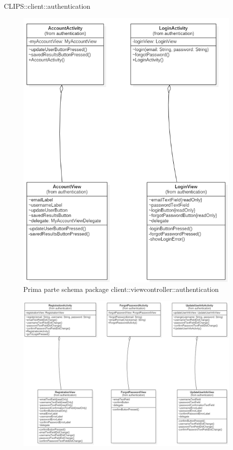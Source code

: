 \begin{componente}{CLIPS::client::authentication}
\begin{figure}[h!]
\centering
\includegraphics[scale=0.3]{img/package/png/client--viewcontroller--authentication1.png}
\caption{Prima parte schema package client::viewcontroller::authentication}
 \end{figure}
 \begin{figure}[h!]
 	\centering
 	\includegraphics[scale=0.3]{img/package/png/client--viewcontroller--authentication2.png}

\end{figure}
\end{componente}

